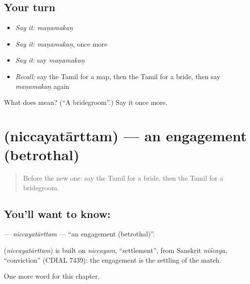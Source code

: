 \subsection*{Your turn}
\begin{itemize}
\raggedright
  \item \emph{Say it:} \emph{maṇamakaṉ}
  \item \emph{Say it:} \emph{maṇamakaṉ}, once more
  \item \emph{Say it:} say \emph{maṇamakaṉ}
  \item \emph{Recall:} say the Tamil for a map, then the Tamil for a bride, then say \emph{maṇamakaṉ} again
\end{itemize}

\begin{tcolorbox}[breakable,colback=teal!4,colframe=teal!35!black,title={Before you move on}]
What does  mean? (\textquotedblleft{}A bridegroom\textquotedblright{}.) Say it once more.
\end{tcolorbox}
\section[\texorpdfstring{\ta{நிச்சயதார்த்தம்} (niccayatārttam)}{நிச்சயதார்த்தம் (niccayatārttam)}]{ (niccayatārttam) — an engagement (betrothal)}

\label{lesson:TA-C217-niccayatarttam}



\begin{quote}
Before the new one: say the Tamil for a bride, then the Tamil for a bridegroom.
\end{quote}

\subsection*{You'll want to know: }
\textbf{} — \emph{niccayatārttam} — \textquotedblleft{}an engagement (betrothal)\textquotedblright{}.

\begin{cousinweb}
\textbf{} (\emph{niccayatārttam}) is built on \emph{niccayam}, \textquotedblleft{}settlement\textquotedblright{}, from Sanskrit \emph{niścaya}, \textquotedblleft{}conviction\textquotedblright{} (CDIAL 7439): the engagement is the settling of the match.
\end{cousinweb}

\begin{grammarlens}[title={What you've built}]
One more word for this chapter.
\end{grammarlens}

